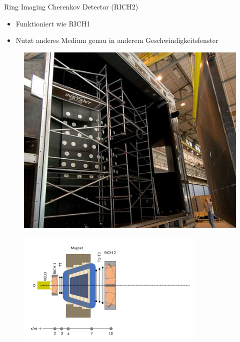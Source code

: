\begin{frame}{Ring Imaging Cherenkov Detector (RICH2)}
    \begin{minipage}{0.58\textwidth}
    \begin{itemize}
        \item Funktioniert wie RICH1
        \item Nutzt anderes Medium  genau in anderem Geschwindigkeitsfenster
    \end{itemize}
    \end{minipage}\hfill
    \begin{minipage}{0.38\textwidth}
        \begin{figure}[h]
        \centering
        \includegraphics[height=2.5 cm]{Figures Introductory Lecture/LHCb Detector/LHCb_RICH2.jpg}%
        \end{figure}
    \end{minipage}
    \vspace{-0.5cm}
    \begin{figure}[h]
    \centering
    \includegraphics[width=0.8\textwidth]{Figures Introductory Lecture/LHCb Detector/LHCb_6_DE.png}
    \end{figure}
\end{frame}
